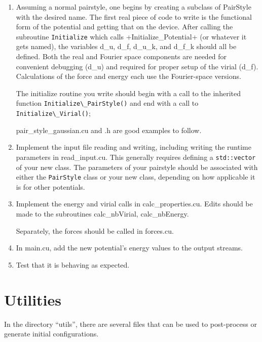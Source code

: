 \documentclass[12pt]{article}
\begin{document}
\begin{enumerate}
	\item
	Assuming a normal pairstyle, one begins by creating a subclass of PairStyle with the desired name. The first real piece of code to write is the functional form of the potential and getting that on the device. After calling the subroutine \verb+Initialize+ which calls +Initialize\_Potential+ (or whatever it gets named), the variables d\_u, d\_f, d\_u\_k, and d\_f\_k should all be defined. Both the real and Fourier space components are needed for convenient debugging (d\_u) and required for proper setup of the virial (d\_f). Calculations of the force and energy each use the Fourier-space versions.
	
	The initialize routine you write should begin with a call to the inherited function \verb+Initialize\_PairStyle()+ and end with a call to \verb+Initialize\_Virial()+;
	
	pair\_style\_gaussian.cu and .h are good examples to follow.
	
	\item
	Implement the input file reading and writing, including writing the runtime parameters in read\_input.cu. This generally requires defining a \verb+std::vector+ of your new class. The parameters of your pairstyle should be associated with either the \verb+PairStyle+ class or your new class, depending on how applicable it is for other potentials. 
	
	\item
	Implement the energy and virial calls in calc\_properties.cu. Edits should be made to the subroutines calc\_nbVirial, calc\_nbEnergy.
	
	Separately, the forces should be called in forces.cu.
	
	\item
	In main.cu, add the new potential's energy values to the output streams.
	
	\item
	Test that it is behaving as expected.
	
\end{enumerate}




\pagebreak
\section{Utilities}

In the directory ``utils'', there are several files that can be used to post-process or generate initial configurations. 
\end{document}
